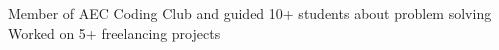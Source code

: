Member of AEC Coding Club and guided 10+ students about problem solving
Worked on 5+ freelancing projects